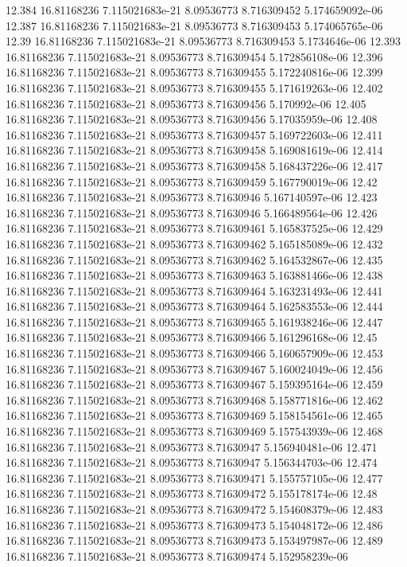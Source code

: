 {12.384 16.81168236 7.115021683e-21 8.09536773 8.716309452 5.174659092e-06
12.387 16.81168236 7.115021683e-21 8.09536773 8.716309453 5.174065765e-06
12.39 16.81168236 7.115021683e-21 8.09536773 8.716309453 5.1734646e-06
12.393 16.81168236 7.115021683e-21 8.09536773 8.716309454 5.172856108e-06
12.396 16.81168236 7.115021683e-21 8.09536773 8.716309455 5.172240816e-06
12.399 16.81168236 7.115021683e-21 8.09536773 8.716309455 5.171619263e-06
12.402 16.81168236 7.115021683e-21 8.09536773 8.716309456 5.170992e-06
12.405 16.81168236 7.115021683e-21 8.09536773 8.716309456 5.17035959e-06
12.408 16.81168236 7.115021683e-21 8.09536773 8.716309457 5.169722603e-06
12.411 16.81168236 7.115021683e-21 8.09536773 8.716309458 5.169081619e-06
12.414 16.81168236 7.115021683e-21 8.09536773 8.716309458 5.168437226e-06
12.417 16.81168236 7.115021683e-21 8.09536773 8.716309459 5.167790019e-06
12.42 16.81168236 7.115021683e-21 8.09536773 8.71630946 5.167140597e-06
12.423 16.81168236 7.115021683e-21 8.09536773 8.71630946 5.166489564e-06
12.426 16.81168236 7.115021683e-21 8.09536773 8.716309461 5.165837525e-06
12.429 16.81168236 7.115021683e-21 8.09536773 8.716309462 5.165185089e-06
12.432 16.81168236 7.115021683e-21 8.09536773 8.716309462 5.164532867e-06
12.435 16.81168236 7.115021683e-21 8.09536773 8.716309463 5.163881466e-06
12.438 16.81168236 7.115021683e-21 8.09536773 8.716309464 5.163231493e-06
12.441 16.81168236 7.115021683e-21 8.09536773 8.716309464 5.162583553e-06
12.444 16.81168236 7.115021683e-21 8.09536773 8.716309465 5.161938246e-06
12.447 16.81168236 7.115021683e-21 8.09536773 8.716309466 5.161296168e-06
12.45 16.81168236 7.115021683e-21 8.09536773 8.716309466 5.160657909e-06
12.453 16.81168236 7.115021683e-21 8.09536773 8.716309467 5.160024049e-06
12.456 16.81168236 7.115021683e-21 8.09536773 8.716309467 5.159395164e-06
12.459 16.81168236 7.115021683e-21 8.09536773 8.716309468 5.158771816e-06
12.462 16.81168236 7.115021683e-21 8.09536773 8.716309469 5.158154561e-06
12.465 16.81168236 7.115021683e-21 8.09536773 8.716309469 5.157543939e-06
12.468 16.81168236 7.115021683e-21 8.09536773 8.71630947 5.156940481e-06
12.471 16.81168236 7.115021683e-21 8.09536773 8.71630947 5.156344703e-06
12.474 16.81168236 7.115021683e-21 8.09536773 8.716309471 5.155757105e-06
12.477 16.81168236 7.115021683e-21 8.09536773 8.716309472 5.155178174e-06
12.48 16.81168236 7.115021683e-21 8.09536773 8.716309472 5.154608379e-06
12.483 16.81168236 7.115021683e-21 8.09536773 8.716309473 5.154048172e-06
12.486 16.81168236 7.115021683e-21 8.09536773 8.716309473 5.153497987e-06
12.489 16.81168236 7.115021683e-21 8.09536773 8.716309474 5.152958239e-06
}
